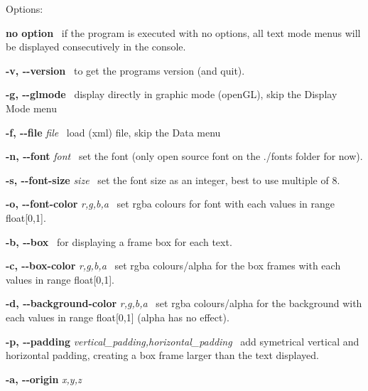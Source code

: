 Options\+:


\begin{DoxyItemize}
\item {\bfseries no option}~\newline
 if the program is executed with no options, all text mode menus will be displayed consecutively in the console. 
\item {\bfseries -\/v, -\/-\/version}~\newline
 to get the program\textquotesingle{}s version (and quit). 
\item {\bfseries -\/g, -\/-\/glmode}~\newline
 display directly in graphic mode (open\+GL), skip the Display Mode menu 
\item {\bfseries -\/f, -\/-\/file} {\itshape file}~\newline
 load (xml) file, skip the Data menu 
\item {\bfseries -\/n, -\/-\/font} {\itshape font}~\newline
 set the font (only open source font on the ./fonts folder for now). 
\item {\bfseries -\/s, -\/-\/font-\/size} {\itshape size}~\newline
 set the font size as an integer, best to use multiple of 8. 
\item {\bfseries -\/o, -\/-\/font-\/color} {\itshape r,g,b,a}~\newline
 set rgba colours for font with each values in range float\mbox{[}0,1\mbox{]}. 
\item {\bfseries -\/b, -\/-\/box}~\newline
 for displaying a frame box for each text. 
\item {\bfseries -\/c, -\/-\/box-\/color} {\itshape r,g,b,a}~\newline
 set rgba colours/alpha for the box frames with each values in range float\mbox{[}0,1\mbox{]}. 
\item {\bfseries -\/d, -\/-\/background-\/color} {\itshape r,g,b,a}~\newline
 set rgba colours/alpha for the background with each values in range float\mbox{[}0,1\mbox{]} (alpha has no effect). 
\item {\bfseries -\/p, -\/-\/padding} {\itshape vertical\+\_\+padding,horizontal\+\_\+padding}~\newline
 add symetrical vertical and horizontal padding, creating a box frame larger than the text displayed. 
\item {\bfseries -\/a, -\/-\/origin} {\itshape x,y,z}~\newline

\end{DoxyItemize}
